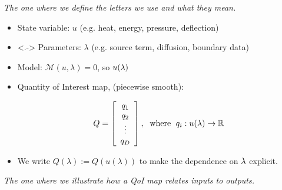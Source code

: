 \begin{frame}[t]{\it The one where we define the letters we use and what they mean.}
\begin{itemize}
	\item State variable: $u$ {\color{gray}(e.g. heat, energy, pressure, deflection)}

	\bigskip
	\item<.-> Parameters: $\lambda$ {\color{gray}(e.g. source term, diffusion, boundary data)}

	\bigskip
		\item Model: $\mathcal{M} (u, \lambda) = 0$, so $u(\param)$

	\bigskip
	\item Quantity of Interest  map, (piecewise smooth):

		$$Q = \mat{c}{q_1\\ q_2\\ \vdots \\ q_\dimD}, \; \text{ where } \; q_i: u(\lambda) \to \RR$$

	\bigskip
	\item We write $Q(\lambda) := Q(u(\lambda))$ to make the dependence on $\param$ explicit.
\end{itemize}

\end{frame}


\begin{frame}{\it The one where we illustrate how a QoI map relates inputs to outputs.}
\centering
\begin{figure}
\centering


\end{figure}

\end{frame}

